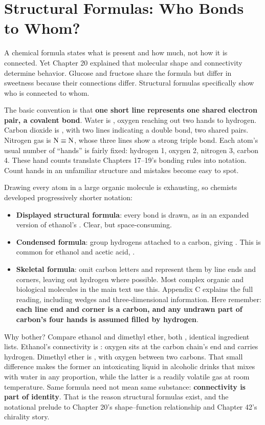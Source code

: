 \section{Structural Formulas: Who Bonds to Whom?}

A chemical formula states what is present and how much, not how it is connected. Yet Chapter 20 explained that molecular shape and connectivity determine behavior. Glucose and fructose share the formula  but differ in sweetness because their connections differ. Structural formulas specifically show who is connected to whom.

The basic convention is that \textbf{one short line represents one shared electron pair, a covalent bond}. Water is , oxygen reaching out two hands to hydrogen. Carbon dioxide is , with two lines indicating a double bond, two shared pairs. Nitrogen gas is $\mathrm{N}\equiv\mathrm{N}$, whose three lines show a strong triple bond. Each atom's usual number of ``hands'' is fairly fixed: hydrogen 1, oxygen 2, nitrogen 3, carbon 4. These hand counts translate Chapters 17--19's bonding rules into notation. Count hands in an unfamiliar structure and mistakes become easy to spot.

Drawing every atom in a large organic molecule is exhausting, so chemists developed progressively shorter notation:

\begin{itemize}[itemsep=2pt]
\item \textbf{Displayed structural formula}: every bond is drawn, as in an expanded version of ethanol's . Clear, but space-consuming.
\item \textbf{Condensed formula}: group hydrogens attached to a carbon, giving . This is common for ethanol and acetic acid, .
\item \textbf{Skeletal formula}: omit carbon letters and represent them by line ends and corners, leaving out hydrogen where possible. Most complex organic and biological molecules in the main text use this. Appendix C explains the full reading, including wedges and three-dimensional information. Here remember: \textbf{each line end and corner is a carbon, and any undrawn part of carbon's four hands is assumed filled by hydrogen}.
\end{itemize}

Why bother? Compare ethanol and dimethyl ether, both , identical ingredient lists. Ethanol's connectivity is : oxygen sits at the carbon chain's end and carries hydrogen. Dimethyl ether is , with oxygen between two carbons. That small difference makes the former an intoxicating liquid in alcoholic drinks that mixes with water in any proportion, while the latter is a readily volatile gas at room temperature. Same formula need not mean same substance: \textbf{connectivity is part of identity}. That is the reason structural formulas exist, and the notational prelude to Chapter 20's shape--function relationship and Chapter 42's chirality story.


